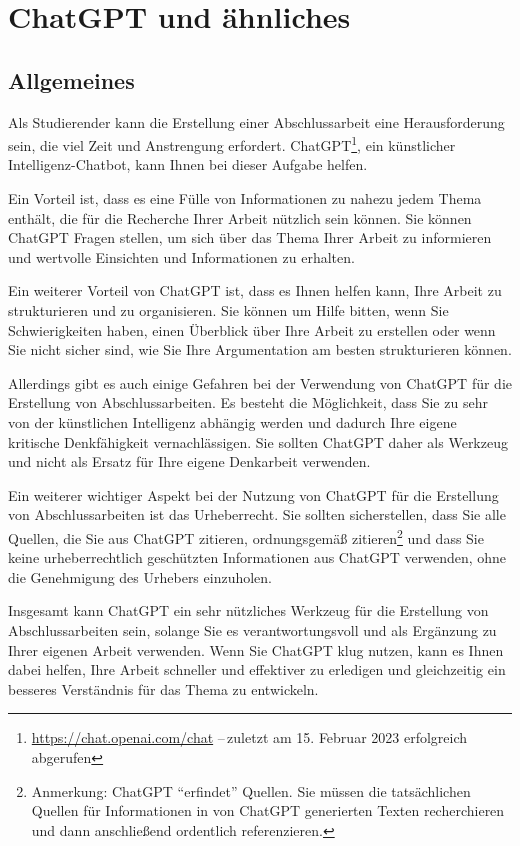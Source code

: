 \chapter{ChatGPT und ähnliches}\label{apdx:ChatGPT}
\section{Allgemeines}
Als Studierender kann die Erstellung einer Abschlussarbeit eine Herausforderung sein, die viel Zeit und Anstrengung erfordert. ChatGPT\footnote{\url{https://chat.openai.com/chat} --\,zuletzt am 15. Februar 2023 erfolgreich abgerufen}, ein künstlicher Intelligenz-Chatbot, kann Ihnen bei dieser Aufgabe helfen.

Ein Vorteil ist, dass es eine Fülle von Informationen zu nahezu jedem Thema enthält, die für die Recherche Ihrer Arbeit nützlich sein können. Sie können ChatGPT Fragen stellen, um sich über das Thema Ihrer Arbeit zu informieren und wertvolle Einsichten und Informationen zu erhalten.

Ein weiterer Vorteil von ChatGPT ist, dass es Ihnen helfen kann, Ihre Arbeit zu strukturieren und zu organisieren. Sie können um Hilfe bitten, wenn Sie Schwierigkeiten haben, einen Überblick über Ihre Arbeit zu erstellen oder wenn Sie nicht sicher sind, wie Sie Ihre Argumentation am besten strukturieren können.

Allerdings gibt es auch einige Gefahren bei der Verwendung von ChatGPT für die Erstellung von Abschlussarbeiten. Es besteht die Möglichkeit, dass Sie zu sehr von der künstlichen Intelligenz abhängig werden und dadurch Ihre eigene kritische Denkfähigkeit vernachlässigen. Sie sollten ChatGPT daher als Werkzeug und nicht als Ersatz für Ihre eigene Denkarbeit verwenden.

Ein weiterer wichtiger Aspekt bei der Nutzung von ChatGPT für die Erstellung von Abschlussarbeiten ist das Urheberrecht. Sie sollten sicherstellen, dass Sie alle Quellen, die Sie aus ChatGPT zitieren, ordnungsgemäß zitieren\footnote{Anmerkung: ChatGPT \enquote{erfindet} Quellen. Sie müssen die tatsächlichen Quellen für Informationen in von ChatGPT generierten Texten recherchieren und dann anschließend ordentlich referenzieren.} und dass Sie keine urheberrechtlich geschützten Informationen aus ChatGPT verwenden, ohne die Genehmigung des Urhebers einzuholen.

Insgesamt kann ChatGPT ein sehr nützliches Werkzeug für die Erstellung von Abschlussarbeiten sein, solange Sie es verantwortungsvoll und als Ergänzung zu Ihrer eigenen Arbeit verwenden. Wenn Sie ChatGPT klug nutzen, kann es Ihnen dabei helfen, Ihre Arbeit schneller und effektiver zu erledigen und gleichzeitig ein besseres Verständnis für das Thema zu entwickeln.

